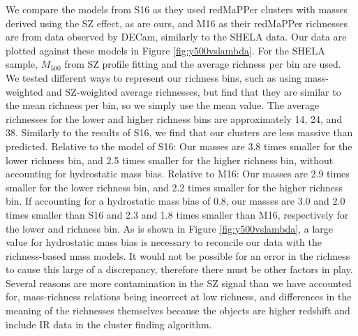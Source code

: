 \documentclass[a4paper,fleqn,usenatbib]{mnras}
\begin{document}
We compare the models from S16 as they used redMaPPer clusters with masses derived using the SZ effect, as are ours, and M16 as their redMaPPer richnesses are from data observed by DECam, similarly to the SHELA data. Our data are plotted against these models in Figure \ref{fig:y500vslambda}. For the SHELA sample, $M_{500}$ from SZ profile fitting and the average richness per bin are used. We tested different ways to represent our richness bins, such as using mass-weighted and SZ-weighted average richnesses, but find that they are similar to the mean richness per bin, so we simply use the mean value. The average richnesses for the lower and higher richness bins are approximately 14, 24, and 38. Similarly to the results of S16, we find that our clusters are less massive than predicted. Relative to the model of S16: Our masses are 3.8 times smaller for the lower richness bin, and 2.5 times smaller for the higher richness bin, without accounting for hydrostatic mass bias. Relative to M16: Our masses are 2.9 times smaller for the lower richness bin, and 2.2 times smaller for the higher richness bin. If accounting for a hydrostatic mass bias of 0.8, our masses are 3.0 and 2.0 times smaller than S16 and 2.3 and 1.8 times smaller than M16, respectively for the lower and richness bin.
As is shown in Figure \ref{fig:y500vslambda}, a large value for hydrostatic mass bias is necessary to reconcile our data with the richness-based mass models. It would not be possible for an error in the richness to cause this large of a discrepancy, therefore there must be other factors in play. Several reasons are more contamination in the SZ signal than we have accounted for, mass-richness relations being incorrect at low richness, and differences in the meaning of the richnesses themselves because the objects are higher redshift and include IR data in the cluster finding algorithm.


\end{document}
